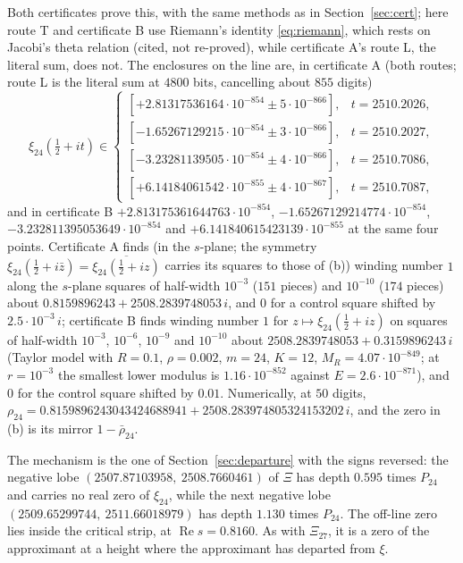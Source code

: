 \documentclass[11pt]{article}
\theoremstyle{plain}
\theoremstyle{definition}
\theoremstyle{remark}
\newcommand{\re}{\operatorname{Re}}
\begin{document}
Both certificates prove this, with the same methods as in
Section~\ref{sec:cert}; here route T and certificate B use Riemann's
identity \eqref{eq:riemann}, which rests on Jacobi's theta relation (cited, not
re-proved), while certificate A's route L, the literal sum, does not. The enclosures on the line are, in certificate A (both
routes; route L is the literal sum at $4800$ bits, cancelling about $855$
digits)
\[
\xi_{24}(\tfrac12 + it) \in
\begin{cases}
[+2.81317536164\cdot10^{-854} \pm 5\cdot10^{-866}], & t = 2510.2026,\\
[-1.65267129215\cdot10^{-854} \pm 3\cdot10^{-866}], & t = 2510.2027,\\
[-3.23281139505\cdot10^{-854} \pm 4\cdot10^{-866}], & t = 2510.7086,\\
[+6.14184061542\cdot10^{-855} \pm 4\cdot10^{-867}], & t = 2510.7087,
\end{cases}
\]
and in certificate B $+2.813175361644763\cdot10^{-854}$,
$-1.65267129214774\cdot10^{-854}$, $-3.232811395053649\cdot10^{-854}$ and
$+6.141840615423139\cdot10^{-855}$ at the same four points. Certificate A finds (in the $s$-plane; the
symmetry $\xi_{24}(\tfrac12 + i\bar z) = \overline{\xi_{24}(\tfrac12 + iz)}$ carries its squares to
those of (b)) winding number $1$ along the $s$-plane squares of half-width $10^{-3}$
($151$ pieces) and $10^{-10}$ ($174$ pieces) about
$0.8159896243 + 2508.2839748053\,i$, and $0$ for a control square shifted by
$2.5\cdot10^{-3}\,i$; certificate B finds winding number $1$ for
$z \mapsto \xi_{24}(\tfrac12 + iz)$ on squares of half-width $10^{-3}$,
$10^{-6}$, $10^{-9}$ and $10^{-10}$ about $2508.2839748053 + 0.3159896243\,i$
(Taylor model with $R = 0.1$, $\rho = 0.002$, $m = 24$, $K = 12$,
$M_R = 4.07\cdot10^{-849}$; at $r = 10^{-3}$ the smallest lower modulus is
$1.16\cdot10^{-852}$ against $E = 2.6\cdot10^{-871}$), and $0$ for the control
square shifted by $0.01$. Numerically, at $50$ digits,
$\rho_{24} = 0.8159896243043424688941 + 2508.283974805324153202\,i$, and the
zero in (b) is its mirror $1 - \bar\rho_{24}$.

The mechanism is the one of Section~\ref{sec:departure} with the signs reversed:
the negative lobe $(2507.87103958,\ 2508.7660461)$ of $\Xi$ has depth $0.595$
times $P_{24}$ and carries no real zero of $\xi_{24}$, while the next negative
lobe $(2509.65299744,\ 2511.66018979)$ has depth $1.130$ times $P_{24}$. The
off-line zero lies inside the critical strip, at $\re s = 0.8160$. As with
$\Xi_{27}$, it is a zero of the approximant at a height where the approximant has
departed from $\xi$.
\end{document}
